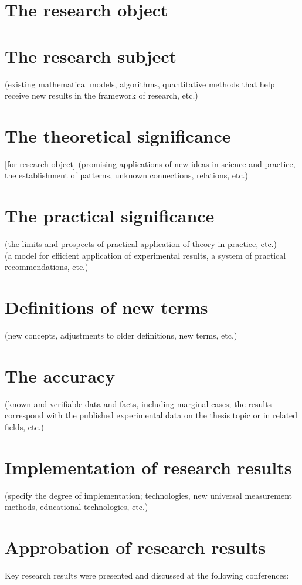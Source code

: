 \section*{The research object}
\section*{The research subject}
(existing mathematical models, algorithms, quantitative methods that help receive new results in the framework of research, etc.)

\section*{The theoretical significance}
[for research object] (promising applications of new ideas in science and practice, the establishment of patterns, unknown connections, relations, etc.)

\section*{The practical significance}
(the limits and prospects of practical application of theory in practice, etc.)\\

(a model for efficient application of experimental results, a system of practical recommendations, etc.)

\section*{Definitions of new terms}
(new concepts, adjustments to older definitions, new terms, etc.)

\section*{The accuracy }
(known and verifiable data and facts, including marginal cases; the results correspond with the published experimental data on the thesis topic or in related fields, etc.)

\section*{Implementation of research results}
(specify the degree of implementation; technologies, new universal measurement methods, educational technologies, etc.)

\section*{Approbation of research results}
Key research results were presented and discussed at the following conferences:

